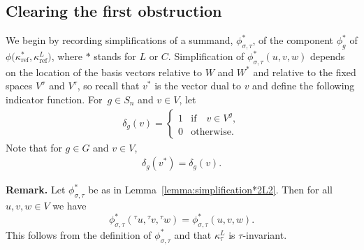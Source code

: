 \documentclass[10pt,a4paper]{amsart}
\numberwithin{equation}{section}
\newcommand{\actbylessspace}[1]{{}^{#1}\!}
\DeclareMathOperator{\refl}{ref}
\begin{document}
\subsection{Clearing the first obstruction}%

We begin by recording simplifications of a summand, $\phi^{*}_{\sigma,\tau}$,
of the component $\phi_{g}^{*}$ of $\phi\big(\kappa^{*}_{\refl},\kappa^L_{\refl}\big)$,
where $*$ stands for $L$ or $C$.
Simplification of $\phi^{*}_{\sigma,\tau}(u,v,w)$ depends on
the location of the basis vectors relative to $W$ and $W^*$ and relative to
the fixed spaces $V^{\sigma}$ and $V^{\tau}$, so recall that $v^*$ is the
vector dual to $v$ and define the following indicator function. For~$g \in S_n$ and $v \in V$, let
\begin{gather*}
\delta_g(v)=\begin{cases}
1 & \text{if}\quad v \in V^{g}, \\
0 & \text{otherwise}.
\end{cases}
\end{gather*}
Note that for $g \in G$ and $v \in V$,
\begin{gather*}
\delta_g(v^*)=\delta_g(v).
\end{gather*}

\noindent\textbf{Remark.}
Let $\phi^*_{\sigma,\tau}$ be as in Lemma~\ref{lemma:simplification*2L2}.
Then for all $u,v,w \in V$ we have
\begin{equation}
\label{tauinv}
\phi^*_{\sigma,\tau}(\actbylessspace{\tau}u,\actbylessspace{\tau}v,\actbylessspace{\tau}w)
=\phi^*_{\sigma,\tau}(u,v,w).
\end{equation}
This follows from the definition of $\phi^*_{\sigma,\tau}$ and that $\kappa^L_{\tau}$
is $\tau$-invariant.
\end{document}
